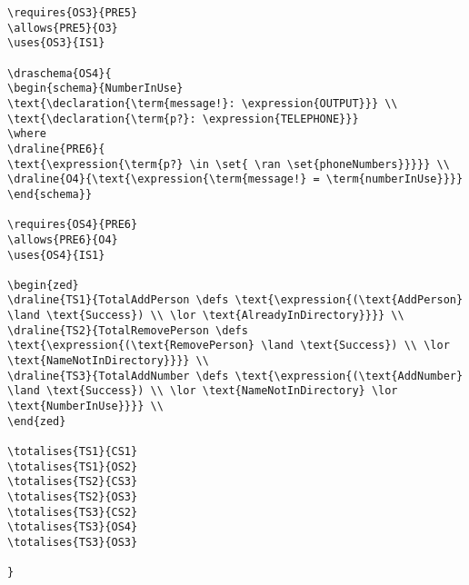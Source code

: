 \begin{verbatim}
\requires{OS3}{PRE5}
\allows{PRE5}{O3}
\uses{OS3}{IS1}

\draschema{OS4}{
\begin{schema}{NumberInUse}
\text{\declaration{\term{message!}: \expression{OUTPUT}}} \\
\text{\declaration{\term{p?}: \expression{TELEPHONE}}}
\where
\draline{PRE6}{
\text{\expression{\term{p?} \in \set{ \ran \set{phoneNumbers}}}}} \\
\draline{O4}{\text{\expression{\term{message!} = \term{numberInUse}}}}
\end{schema}}

\requires{OS4}{PRE6}
\allows{PRE6}{O4}
\uses{OS4}{IS1}

\begin{zed}
\draline{TS1}{TotalAddPerson \defs \text{\expression{(\text{AddPerson} \land \text{Success}) \\ \lor \text{AlreadyInDirectory}}}} \\
\draline{TS2}{TotalRemovePerson \defs \text{\expression{(\text{RemovePerson} \land \text{Success}) \\ \lor \text{NameNotInDirectory}}}} \\
\draline{TS3}{TotalAddNumber \defs \text{\expression{(\text{AddNumber} \land \text{Success}) \\ \lor \text{NameNotInDirectory} \lor \text{NumberInUse}}}} \\
\end{zed}

\totalises{TS1}{CS1}
\totalises{TS1}{OS2}
\totalises{TS2}{CS3}
\totalises{TS2}{OS3}
\totalises{TS3}{CS2}
\totalises{TS3}{OS4}
\totalises{TS3}{OS3}

}


\end{verbatim}
